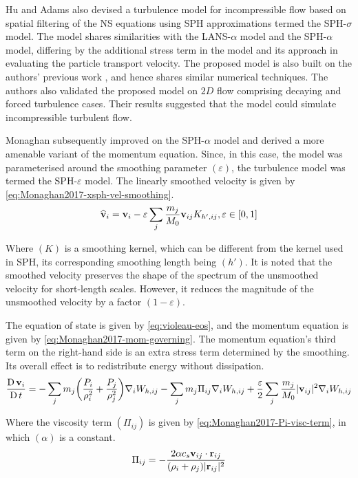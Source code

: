 Hu and Adams \parencite{Hu2015} also devised a turbulence model for incompressible flow based on spatial filtering of the NS equations using SPH approximations termed the SPH-$\sigma$ model. The model shares similarities with the LANS-$\alpha$ model and the SPH-$\alpha$ model, differing by the additional stress term in the model and its approach in evaluating the particle transport velocity. The proposed model is also built on the authors' previous work \parencite{hu2007incompressible}, and hence shares similar numerical techniques. The authors also validated the proposed model on $2D$ flow comprising decaying and forced turbulence cases. Their results suggested that the model could simulate incompressible turbulent flow.

Monaghan \parencite{Monaghan2011, Monaghan2017} subsequently improved on the SPH-$\alpha$ model and derived a more amenable variant of the momentum equation. Since, in this case, the model was parameterised around the smoothing parameter $(\varepsilon)$, the turbulence model was termed the SPH-$\varepsilon$ model. The linearly smoothed velocity is given by \ref{eq:Monaghan2017-xsph-vel-smoothing}.
\begin{equation}
	\widehat{\mathbf{v}}_i = \mathbf{v}_i - \varepsilon \sum_j \frac{m_j}{M_0} \mathbf{v}_{ij} K_{h', ij}, \varepsilon \in [0, 1]
	\label{eq:Monaghan2017-xsph-vel-smoothing}
\end{equation}

Where $(K)$ is a smoothing kernel, which can be different from the kernel used in SPH, its corresponding smoothing length being $(h')$. It is noted that the smoothed velocity preserves the shape of the spectrum of the unsmoothed velocity for short-length scales. However, it reduces the magnitude of the unsmoothed velocity by a factor $(1-\varepsilon)$. 

The equation of state is given by \ref{eq:violeau-eos}, and the momentum equation is given by \ref{eq:Monaghan2017-mom-governing}. The momentum equation's third term on the right-hand side is an extra stress term determined by the smoothing. Its overall effect is to redistribute energy without dissipation.
\begin{equation}
	\frac{\operatorname{D} \mathbf{v}_i}{\operatorname{D} t} = - \sum_j m_j \bigg( \frac{P_i}{\rho_i^2} + \frac{P_j}{\rho_j^2} \bigg) \nabla_{i} W_{h, ij} - \sum_j m_j \Pi_{ij} \nabla_{i} W_{h, ij} + \frac{\varepsilon}{2} \sum_j \frac{m_j}{M_0} |\mathbf{v}_{ij}|^2 \nabla_{i} W_{h, ij}
	\label{eq:Monaghan2017-mom-governing}
\end{equation}

Where the viscosity term $(\Pi_{ij})$ is given by \ref{eq:Monaghan2017-Pi-visc-term}, in which $(\alpha)$ is a constant.
\begin{equation}
	\Pi_{ij} = - \frac{2 \alpha c_s \mathbf{v}_{ij} \cdot \mathbf{r}_{ij}}{(\rho_i + \rho_j) |\mathbf{r}_{ij}|^{2}}
	\label{eq:Monaghan2017-Pi-visc-term}
\end{equation}

